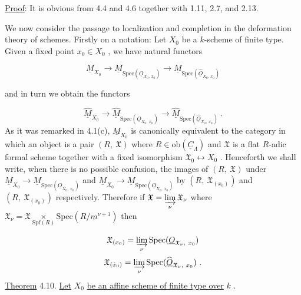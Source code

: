 \underline{Proof}: It is obvious from 4.4 and 4.6 together with 1.11, 2.7, and 2.13.

We now consider the passage to localization and completion in the deformation theory     of schemes. Firstly on a notation: Let $X_0$ be a $k$-scheme of finite type. Given a fixed point $x_0 \in X_0$ , we have natural functors

\begin{equation*}
\underline{M}_{X_0} \to \underline{M}_{\mathrm{Spec}(\underline{O}_{X_0,\, x_0})} \to \underline{M}_{\mathrm{Spec}(\widehat{\underline{O}}_{X_0,\, x_0})} 
\end{equation*}


 and in turn we obtain the functors

\begin{equation*}
\widehat{\underline{M}}_{X_0} \to \widehat{\underline{M}}_{\mathrm{Spec}(\underline{O}_{X_0,\ x_0})} \to \widehat{\underline{M}}_{\mathrm{Spec}(\widehat{\underline{O}}_{X_0,\ x_0})}\ .
\end{equation*}
As it was remarked in 4.1(c), $\underline{M}_{X_0}$  is canonically equivalent to the category in which an object is a pair  $(R,\ \mathfrak{X})$  where  $R \in \mathrm{ob}(\underline{C}_{\Lambda})$  and  $\mathfrak{X}$  is a flat $R$-adic formal scheme together with a fixed isomorphism  $\mathfrak{X}_0 \longleftrightarrow X_0$ . Henceforth we shall write, when there is no possible confusion, the images of  $(R,\ \mathfrak{X})$  under $\underline{M}_{X_0} \to \underline{M}_{\mathrm{Spec}(\underline{O}_{X_0,\ x_0})}$  and  $\underline{M}_{X_0} \to \underline{M}_{\mathrm{Spec}(\underline{O}_{X_0,\ x_0})}$  by  $(R,\ \mathfrak{X}_{(x_0)})$  and  $(R,\ \mathfrak{X}_{(x_0)})$ respectively. Therefore if  $\mathfrak{X} = \varinjlim\limits_{\nu} \mathfrak{X}_{\nu}$  where  $\mathfrak{X}_{\nu} = \mathfrak{X} \underset{\mathrm{Spf}(R)}{\times} \mathrm{Spec}(R/\underline{m}^{\nu+1})$    then

\begin{equation*}
\mathfrak{X}_{(x_0)} = \varinjlim\limits_{\nu} \mathrm{Spec}(\underline{O}_{\mathfrak{X}_{\nu},\ x_0})
\end{equation*}
\begin{equation*}
\mathfrak{X}_{(\hat{x}_0)} = \varinjlim\limits_{\nu} \mathrm{Spec}(\widehat{\underline{O}}_{\mathfrak{X}_{\nu},\ x_0})\ .
\end{equation*}
\underline{Theorem} 4.10. \underline{Let}  $X_0$  \underline{be an affine scheme of finite type over}  $k$  .

